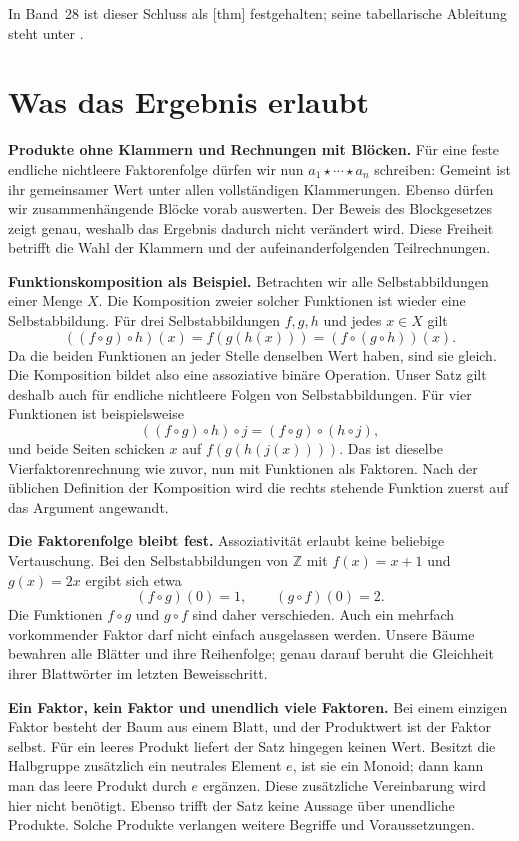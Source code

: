 In Band~28 ist dieser Schluss als
[thm] festgehalten; seine
tabellarische Ableitung steht unter
.

\clearpage
\section*{Was das Ergebnis erlaubt}

\medskip\noindent\textbf{Produkte ohne Klammern und Rechnungen mit Blöcken.}
Für eine feste endliche nichtleere Faktorenfolge dürfen wir nun
\(a_1\star\cdots\star a_n\) schreiben: Gemeint ist ihr gemeinsamer
Wert unter allen vollständigen Klammerungen. Ebenso dürfen wir
zusammenhängende Blöcke vorab auswerten. Der Beweis des Blockgesetzes
zeigt genau, weshalb das Ergebnis dadurch nicht verändert wird.
Diese Freiheit betrifft die Wahl der Klammern und der
aufeinanderfolgenden Teilrechnungen.

\medskip\noindent\textbf{Funktionskomposition als Beispiel.}
Betrachten wir alle Selbstabbildungen einer Menge \(X\).
Die Komposition zweier solcher Funktionen ist wieder eine
Selbstabbildung. Für drei Selbstabbildungen \(f,g,h\) und jedes
\(x\in X\) gilt
\[
  ((f\circ g)\circ h)(x)
    =f(g(h(x)))
    =(f\circ(g\circ h))(x).
\]
Da die beiden Funktionen an jeder Stelle denselben Wert haben,
sind sie gleich. Die Komposition bildet also eine assoziative
binäre Operation. Unser Satz gilt deshalb auch für endliche
nichtleere Folgen von Selbstabbildungen. Für vier Funktionen ist
beispielsweise
\[
  ((f\circ g)\circ h)\circ j
    =(f\circ g)\circ(h\circ j),
\]
und beide Seiten schicken \(x\) auf \(f(g(h(j(x))))\).
Das ist dieselbe Vierfaktorenrechnung wie zuvor, nun mit Funktionen
als Faktoren. Nach der üblichen Definition der Komposition wird
die rechts stehende Funktion zuerst auf das Argument angewandt.

\medskip\noindent\textbf{Die Faktorenfolge bleibt fest.}
Assoziativität erlaubt keine beliebige Vertauschung. Bei den
Selbstabbildungen von \(\mathbb Z\) mit
\(f(x)=x+1\) und \(g(x)=2x\) ergibt sich etwa
\[
  (f\circ g)(0)=1,
  \qquad
  (g\circ f)(0)=2.
\]
Die Funktionen \(f\circ g\) und \(g\circ f\) sind daher
verschieden. Auch ein mehrfach vorkommender Faktor darf nicht
einfach ausgelassen werden. Unsere Bäume bewahren alle Blätter
und ihre Reihenfolge; genau darauf beruht die Gleichheit ihrer
Blattwörter im letzten Beweisschritt.

\par{}
\medskip\noindent\textbf{Ein Faktor, kein Faktor und unendlich viele Faktoren.}
Bei einem einzigen Faktor besteht der Baum aus einem Blatt, und der
Produktwert ist der Faktor selbst. Für ein leeres Produkt liefert der
Satz hingegen keinen Wert. Besitzt die Halbgruppe zusätzlich ein
neutrales Element \(e\), ist sie ein Monoid; dann kann man das
leere Produkt durch \(e\) ergänzen. Diese zusätzliche Vereinbarung
wird hier nicht benötigt. Ebenso trifft der Satz keine Aussage über
unendliche Produkte. Solche Produkte verlangen weitere Begriffe und
Voraussetzungen.

